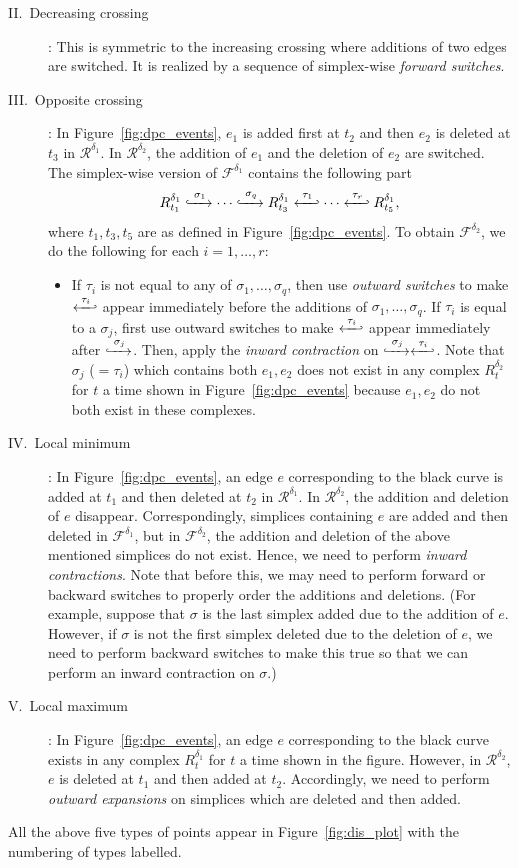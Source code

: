 \documentclass[letterpaper,11pt]{article}
\theoremstyle{mythmstyle}
\theoremstyle{mydefstyle}
\theoremstyle{plain}
\theoremstyle{definition}
\newcommand{\<}[1]{\langle #1\rangle}
\newcommand{\lbarrowspace}{\;}
\newcommand{\inctosp}[1]{\xhookrightarrow{\lbarrowspace#1\lbarrowspace}}
\newcommand{\bakinctosp}[1]{\xhookleftarrow{\lbarrowspace#1\lbarrowspace}}
\newcommand{\Fcal}{\mathcal{F}}
\newcommand{\Rcal}{\mathcal{R}}
\newcommand{\dG}{\delta}
\newcommand{\sG}{\sigma}
\newcommand{\tG}{\tau}
\begin{document}
{\begin{description}
  \item[II.\ Decreasing crossing]:
  This is symmetric to the increasing crossing
  where additions of two edges are switched. It is realized by a sequence
  of simplex-wise \emph{forward switches}.

  \item[III.\ Opposite crossing]:
  In Figure~\ref{fig:dpc_events},
  $e_1$ is added first at $t_2$ and then $e_2$ is deleted at $t_3$
  in $\Rcal^{\dG_1}$.
  In $\Rcal^{\dG_2}$, the addition of $e_1$ and the deletion of $e_2$ are switched.
  The simplex-wise version of $\Fcal^{\dG_1}$ contains the following part
  \[R^{\dG_1}_{t_1}\inctosp{\sG_1}\cdots\inctosp{\sG_q} R^{\dG_1}_{t_3}
  \bakinctosp{\tG_1}\cdots\bakinctosp{\tG_r} R^{\dG_1}_{t_5},\]
  where $t_1,t_3,t_5$ are as defined in Figure~\ref{fig:dpc_events}.
  To obtain $\Fcal^{\dG_2}$, we do the following for each $i=1,\ldots,r$:
  \begin{itemize}
      \item 
  If $\tG_i$ is not equal to any of $\sG_1,\ldots,\sG_q$, 
  then use \emph{outward switches} to make $\bakinctosp{\tG_i}$ appear
  immediately before the additions of $\sG_1,\ldots,\sG_q$.
  If $\tG_i$ is equal to a $\sG_j$, first use outward switches 
  to make $\bakinctosp{\tG_i}$ appear
  immediately after $\inctosp{\sG_j}$. 
  Then, apply the \emph{inward contraction} on $\inctosp{\sG_j}\bakinctosp{\tG_i}$.
  Note that $\sG_j$ ($=\tG_i$) which contains both $e_1,e_2$
  does not exist in any complex $R^{\dG_2}_t$
  for $t$ a time shown in Figure~\ref{fig:dpc_events}
  because $e_1,e_2$ do not both exist in these complexes.
  \end{itemize}

  \item[IV.\ Local minimum]:
  In Figure~\ref{fig:dpc_events},
  an edge $e$ corresponding to the black curve 
  is added at $t_1$ and then deleted at $t_2$ in $\Rcal^{\dG_1}$.
  In $\Rcal^{\dG_2}$, the addition and deletion of $e$ disappear.
  Correspondingly,
  simplices containing $e$ are added and then deleted in $\Fcal^{\dG_1}$, 
  but in $\Fcal^{\dG_2}$, the addition and deletion of the above mentioned simplices do not exist.
  Hence, we need to perform \emph{inward contractions}.
  Note that before this, we may need to perform forward or backward switches
  to properly order the additions and deletions.
  (For example, suppose that $\sG$ is the last simplex added 
  due to the addition of $e$.
  However, if $\sG$ is not the first simplex deleted 
  due to the deletion of $e$,
  we need to perform backward switches to make 
  this true
  so that we can perform an inward contraction on $\sG$.)

  \item[V.\ Local maximum]:
  In Figure~\ref{fig:dpc_events},
  an edge $e$ corresponding to the black curve 
  exists in any complex $R^{\dG_1}_t$ for $t$ a time shown in the figure.
  However, in $\Rcal^{\dG_2}$,
  $e$ is deleted at $t_1$ and then added at $t_2$.
  Accordingly, we need to perform \emph{outward expansions}
  on simplices which are deleted and then added.
\end{description}

All the above five types of points appear in Figure~\ref{fig:dis_plot} 
with the numbering of types labelled.}
\end{document}
